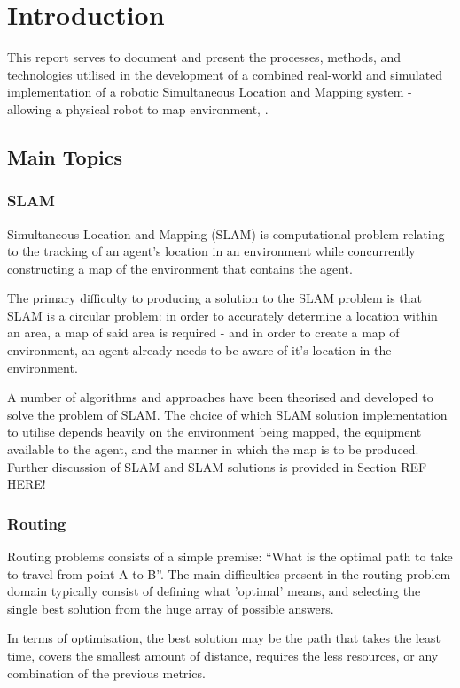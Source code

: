 \section{Introduction} \label{sec_introduction}
This report serves to document and present the processes, methods, and
technologies utilised in the development of a combined real-world and
simulated implementation of a robotic Simultaneous Location and Mapping
system - allowing a physical robot to map environment, .


\subsection{Main Topics}
\subsubsection{SLAM}
Simultaneous Location and Mapping (SLAM) is computational problem relating
to the tracking of an agent's location in an environment while concurrently
constructing a map of the environment that contains the agent.

The primary difficulty to producing a solution to the SLAM problem is
that SLAM is a circular problem: in order to accurately determine a location
within an area, a map of said area is required - and in order to create a map
of environment, an agent already needs to be aware of it's location in the
environment.

A number of algorithms and approaches have been theorised and developed to
solve the problem of SLAM.
The choice of which SLAM solution implementation to utilise depends heavily
on the environment being mapped, the equipment available to the agent, and the
manner in which the map is to be produced.
Further discussion of SLAM and SLAM solutions is provided in Section REF HERE!


\subsubsection{Routing}
Routing problems consists of a simple premise: ``What is the optimal path to
take to travel from point A to B''.
The main difficulties present in the routing problem domain typically consist of
defining what 'optimal' means, and selecting the single best solution from the
huge array of possible answers.

In terms of optimisation, the best solution may be the path that takes the
least time, covers the smallest amount of distance, requires the less
resources, or any combination of the previous metrics.

